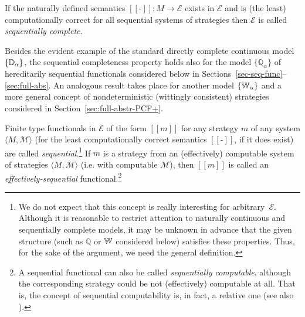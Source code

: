 \documentclass[fleqn]{LMCS}
\theoremstyle{plain}\newtheorem{satz}[thm]{Satz}
\theoremstyle{plain}\newtheorem{hyp}[thm]{Hypothesis}
\theoremstyle{plain}\newtheorem{hyps}[thm]{Hypotheses}
\theoremstyle{definition}\newtheorem{note}[thm]{Note}
\newcommand{\EE}{\mathcal{E}}
\newcommand{\defis}{\mbox{-}}
\newcommand{\setof}[1]{\{#1\}}
\newcommand{\arr}{\rightarrow}
\newcommand{\la}{\langle}
\newcommand{\ra}{\rangle}
\newcommand{\Dsem}[1]{[\![ #1 ]\!]}
\newcommand{\tuple}[1]{\la #1 \ra}
\newcommand{\bbQ}{\mathbb{Q}}
\newcommand{\MM}{{\mathcal M}}
\newcommand{\?}{\mbox{?}}
\begin{document}
\begin{defi}\label{def:sequentially-complete}If the naturally defined semantics $\Dsem{\defis}:M\arr\EE$ 
exists in $\EE$ and is (the least) computationally correct
for all sequential systems of strategies then $\EE$ 
is called \emph{sequentially complete}. 
\end{defi}

\noindent
Besides the evident example of the standard directly complete 
continuous model $\setof{\bbD_\alpha}$, 
the sequential completeness property holds also for 
the model $\setof{\bbQ_\alpha}$ of hereditarily sequential functionals
considered below in 
Sections~\ref{sec-seq-func}--\ref{sec:full-abs}. 
An analogous result takes place for another model $\setof{\bbW_\alpha}$ and a 
more general 
concept of nondeterministic (wittingly consistent)
strategies considered in Section~\ref{sec:full-abstr-PCF+}. 



\begin{defi}\label{def:seq-func}Finite type functionals in $\EE$ of the form $\Dsem{m}$ 
for any strategy $m$ of any system $\tuple{M,\MM}$
(for the least computationally correct semantics $\Dsem{\defis}$, 
if it does exist)
are called 
\emph{sequential}.\footnote{We do not expect that this concept is really interesting 
for arbitrary~$\EE$. 
Although it is reasonable to restrict attention to naturally continuous and 
sequentially complete models, it may be unknown in advance that the given structure 
(such as $\bbQ$ or $\mathbb{W}$ considered below) satisfies these properties. 
Thus, for the sake of the argument, we need the general definition. 
}
If $m$ is a strategy from an (effectively) computable system 
of strategies $\tuple{M,\MM}$ (i.e. with computable 
$\MM$), 
then $\Dsem{m}$ is called
an \emph{effectively-sequential} functional.\footnote{A sequential functional can also be called 
\emph{sequentially computable}, although the corresponding strategy could 
be not (effectively) computable at all. 
That is, the concept of sequential computability is, in fact, a relative one 
(see also \cite{MTrakhte76TCS,Saz76d}).
}
\end{defi}
\end{document}

